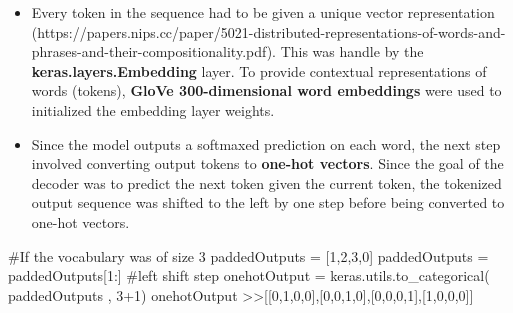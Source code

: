 \documentclass[12pt]{article}
\begin{document}
\begin{itemize}
    \item Every token in the sequence had to be given a unique vector representation (https://papers.nips.cc/paper/5021-distributed-representations-of-words-and-phrases-and-their-compositionality.pdf). This was handle by the \textbf{keras.layers.Embedding} layer. To provide contextual representations of words (tokens), \textbf{GloVe 300-dimensional word embeddings} were used to initialized the embedding layer weights. 
    \item Since the model outputs a softmaxed prediction on each word, the next step involved converting output tokens to \textbf{one-hot vectors}. Since the goal of the decoder was to predict the next token given the current token, the tokenized output sequence was shifted to the left by one step before being converted to one-hot vectors.  
\end{itemize}
\begin{python}
    #If the vocabulary was of size 3
    paddedOutputs = [1,2,3,0]
    paddedOutputs = paddedOutputs[1:] #left shift step
    onehotOutput = keras.utils.to_categorical( paddedOutputs , 3+1)
    onehotOutput
    >>[[0,1,0,0],[0,0,1,0],[0,0,0,1],[1,0,0,0]]
\end{python}
\end{document}
